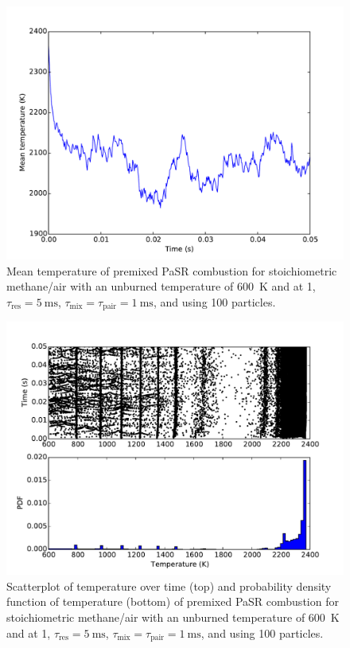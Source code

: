 \documentclass[preprint,12pt]{elsarticle}
\begin{document}
{\begin{figure}[tbp]
\centering
\includegraphics[width=.75\textwidth]{CH4_600K_1atm_mean_temperature.pdf}
\caption{Mean temperature of premixed PaSR combustion for stoichiometric methane\slash air with an unburned temperature of \SI{600}{\kelvin} and at \SI{1}{\atm}, $\tau_{\text{res}} = \SI{5}{\milli\second}$, $\tau_{\text{mix}} = \tau_{\text{pair}} = \SI{1}{\milli\second}$, and using 100 particles.}
\label{F:ch4_meantemp}
\end{figure}

\begin{figure}[tbp]
\centering
\includegraphics[width=.75\textwidth]{CH4_600K_1atm_particle_temperature.pdf}
\caption{Scatterplot of temperature over time (top) and probability density function of temperature (bottom) of premixed PaSR combustion for stoichiometric methane\slash air with an unburned temperature of \SI{600}{\kelvin} and at \SI{1}{\atm}, $\tau_{\text{res}} = \SI{5}{\milli\second}$, $\tau_{\text{mix}} = \tau_{\text{pair}} = \SI{1}{\milli\second}$, and using 100 particles.}
\label{F:ch4_particle_temp}
\end{figure}

}
\end{document}
